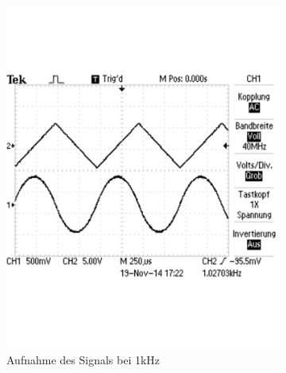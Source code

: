 \documentclass[12pt,a4paper]{article}
\begin{document}
\begin{figure}[H]
\begin{subfigure}[b]{0.28\textwidth}
                \includegraphics[width=\textwidth , scale = 0.4]{2_6_drei_1k.pdf}
                \caption[Aufnahme des Signals bei 1kHz]{Aufnahme des Signals bei 1kHz}
                \label{fig:2_6_drei_1k}
        \end{subfigure}
        \hfill
        \begin{subfigure}[b]{0.28\textwidth}

\end{subfigure}
\end{figure}
\end{document}
